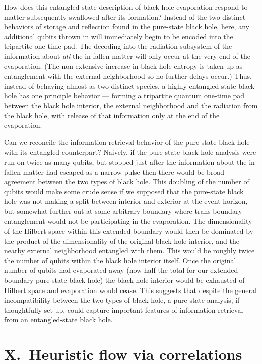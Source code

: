 \documentclass[aps,showpacs,prl,12pt]{revtex4}
\begin{document}
How does this entangled-state description of black hole evaporation
respond to matter subsequently swallowed after its formation? Instead
of the two distinct behaviors of storage and reflection found in the
pure-state black hole, here, any additional qubits thrown in will
immediately begin to be encoded into the tripartite one-time pad.
The decoding into the radiation subsystem of the information about
{\it all\/} the in-fallen matter will only occur at the very end of
the evaporation. (The non-extensive increase in black 
hole entropy is taken up as entanglement with the external neighborhood 
so no further delays occur.) Thus, instead of behaving almost
as two distinct species, a highly entangled-state black hole has one
principle behavior --- forming a tripartite quantum one-time pad
between the black hole interior, the external neighborhood
and the radiation from the black hole, with release of that information
only at the end of the evaporation.

Can we reconcile the information retrieval behavior of the pure-state
black hole with its entangled counterpart? Naively, if the pure-state
black hole analysis were run on twice as many qubits, but stopped
just after the information about the in-fallen matter had escaped
as a narrow pulse then there would be broad agreement between the
two types of black hole. This doubling of the number of qubits would make some
crude sense if we supposed that the pure-state black hole was not making
a split between interior and exterior at the event horizon, but
somewhat further out at some arbitrary boundary where trans-boundary
entanglement would not be participating in the evaporation. The
dimensionality of the Hilbert space within this extended boundary
would then be dominated by the product of the dimensionality of the
original black hole interior, and the nearby external neighborhood entangled
with them. This would be roughly twice the number of qubits within the
black hole interior itself. Once the original number of qubits had
evaporated away (now half the total for our extended boundary
pure-state black hole) the black hole interior would be exhausted of
Hilbert space and evaporation would cease. This suggests that
despite the general incompatibility between the two types of black hole, a
pure-state analysis, if thoughtfully set up, could capture important
features of information retrieval from an entangled-state black hole.



\section{X.\ Heuristic flow via correlations}
\label{heuristic}
\end{document}
